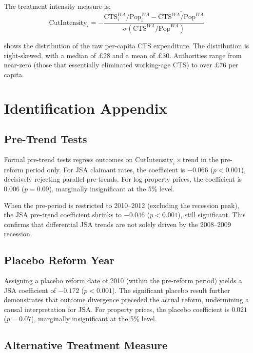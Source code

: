 \documentclass[12pt]{article}
\begin{document}
The treatment intensity measure is:
\begin{equation}
\text{CutIntensity}_i = -\frac{\text{CTS}_{i}^{WA}/\text{Pop}_{i}^{WA} - \overline{\text{CTS}^{WA}/\text{Pop}^{WA}}}{\sigma(\text{CTS}^{WA}/\text{Pop}^{WA})}
\end{equation}

 shows the distribution of the raw per-capita CTS expenditure. The distribution is right-skewed, with a median of \pounds28 and a mean of \pounds30. Authorities range from near-zero (those that essentially eliminated working-age CTS) to over \pounds76 per capita.

\section{Identification Appendix}\label{app:id}

\subsection{Pre-Trend Tests}

Formal pre-trend tests regress outcomes on $\text{CutIntensity}_i \times \text{trend}$ in the pre-reform period only. For JSA claimant rates, the coefficient is $-0.066$ ($p < 0.001$), decisively rejecting parallel pre-trends. For log property prices, the coefficient is $0.006$ ($p = 0.09$), marginally insignificant at the 5\% level.

When the pre-period is restricted to 2010--2012 (excluding the recession peak), the JSA pre-trend coefficient shrinks to $-0.046$ ($p < 0.001$), still significant. This confirms that differential JSA trends are not solely driven by the 2008--2009 recession.

\subsection{Placebo Reform Year}

Assigning a placebo reform date of 2010 (within the pre-reform period) yields a JSA coefficient of $-0.172$ ($p < 0.001$). The significant placebo result further demonstrates that outcome divergence preceded the actual reform, undermining a causal interpretation for JSA. For property prices, the placebo coefficient is $0.021$ ($p = 0.07$), marginally insignificant at the 5\% level.

\subsection{Alternative Treatment Measure}
\end{document}
